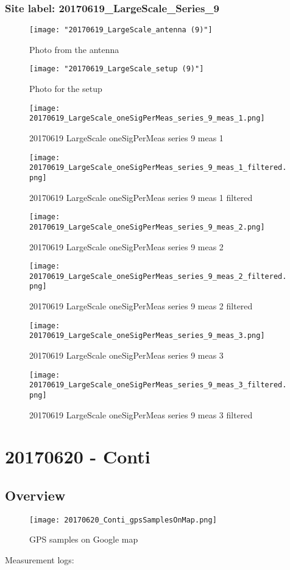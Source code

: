 \subsubsection{Site label: 20170619\_LargeScale\_Series\_9}
\begin{figure}[ht] \caption{Photo from the antenna}
\texttt{[image: "20170619\_LargeScale\_antenna (9)"]}\centering\end{figure}
\begin{figure}[ht] \caption{Photo for the setup}
\texttt{[image: "20170619\_LargeScale\_setup (9)"]}\centering\end{figure}
\begin{figure}[ht] \caption{20170619 LargeScale oneSigPerMeas series 9 meas 1}
\texttt{[image: 20170619\_LargeScale\_oneSigPerMeas\_series\_9\_meas\_1.png]}\centering\end{figure}
\begin{figure}[ht] \caption{20170619 LargeScale oneSigPerMeas series 9 meas 1 filtered}
\texttt{[image: 20170619\_LargeScale\_oneSigPerMeas\_series\_9\_meas\_1\_filtered.png]}\centering\end{figure}
\begin{figure}[ht] \caption{20170619 LargeScale oneSigPerMeas series 9 meas 2}
\texttt{[image: 20170619\_LargeScale\_oneSigPerMeas\_series\_9\_meas\_2.png]}\centering\end{figure}
\begin{figure}[ht] \caption{20170619 LargeScale oneSigPerMeas series 9 meas 2 filtered}
\texttt{[image: 20170619\_LargeScale\_oneSigPerMeas\_series\_9\_meas\_2\_filtered.png]}\centering\end{figure}
\begin{figure}[ht] \caption{20170619 LargeScale oneSigPerMeas series 9 meas 3}
\texttt{[image: 20170619\_LargeScale\_oneSigPerMeas\_series\_9\_meas\_3.png]}\centering\end{figure}
\begin{figure}[ht] \caption{20170619 LargeScale oneSigPerMeas series 9 meas 3 filtered}
\texttt{[image: 20170619\_LargeScale\_oneSigPerMeas\_series\_9\_meas\_3\_filtered.png]}\centering\end{figure}
\clearpage
\section{20170620 - Conti}
\subsection{Overview}
\begin{figure}[ht] \caption{GPS samples on Google map}
\texttt{[image: 20170620\_Conti\_gpsSamplesOnMap.png]}\centering\end{figure}
\begin{minipage}{\textwidth} Measurement logs:

 \end{minipage}
\clearpage
